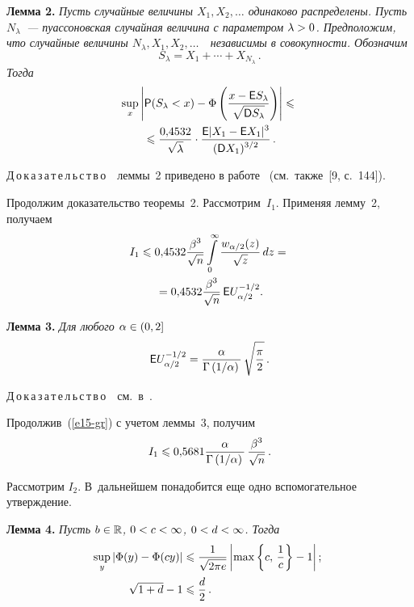 \begin{multicols}{2}
\medskip

\noindent
\textbf{Лемма 2.} \textit{Пусть случайные величины $X_1,X_2,\ldots$\linebreak
одинаково распределены. Пусть $N_{\lambda}$~--- пуассоновская
случайная величина с параметром $\lambda\hm>0$. Предположим, что
случайные величины $N_{\lambda},X_1,X_2,\ldots$\ \ независимы в
совокупности. Обозначим
$$
S_{\lambda}=X_1+\cdots+X_{N_{\lambda}}\,.
$$
Тогда}
\begin{multline*}
\sup\limits_x\left\vert {\sf P}(S_{\lambda}<x)-\Phi\left(\displaystyle\frac{\displaystyle x-{\sf E}S_{\lambda}\mathstrut}{\displaystyle \sqrt{{\sf D}S_{\lambda}}\mathstrut}\right)\right\vert 
\leqslant{}\\
{}\leqslant \displaystyle\frac{\displaystyle 0{,}4532\mathstrut}{\displaystyle \sqrt{\lambda}\mathstrut}\cdot\displaystyle\frac{\displaystyle {\sf E}|X_1-{\sf E}X_1|^3\mathstrut}{\displaystyle ({\sf D}X_1)^{3/2}\mathstrut}\,.
\end{multline*}


\noindent
Д\,о\,к\,а\,з\,а\,т\,е\,л\,ь\,с\,т\,в\,о\ \ леммы~2 приведено в 
работе~\cite{KorolevShevtsovaShorgin2011} (см.\ так\-же~[9, с.~144]).

\smallskip

Продолжим доказательство теоремы~2. Рас\-смот\-рим~$I_1$. Применяя лемму~2, получаем
\begin{multline}
I_1\leqslant0{,}4532\displaystyle\frac{\displaystyle \beta^3\mathstrut}{\displaystyle \sqrt{n}\mathstrut}\int\limits_{0}^{\infty}
\displaystyle\frac{\displaystyle w_{\alpha/2}(z)\mathstrut}{\displaystyle \sqrt{z}\mathstrut}\,
dz={}\\
{}=0{,}4532\displaystyle\frac{\displaystyle \beta^3\mathstrut}{\displaystyle \sqrt{n}\mathstrut}\,{\sf E}U_{\alpha/2}^{-1/2}.\label{e15-gr}
\end{multline}

\medskip

\noindent
\textbf{Лемма 3.} \textit{Для любого $\alpha\hm\in(0,2]$}
$$
{\sf E}U_{\alpha/2}^{-1/2}=\displaystyle\frac{\displaystyle \alpha\mathstrut}{\displaystyle \Gamma\left({1}/{\alpha}\right)\mathstrut}\,
\sqrt{\displaystyle\frac{\displaystyle \pi\mathstrut}{\displaystyle 2\mathstrut}}\,.
$$

\smallskip

\noindent
Д\,о\,к\,а\,з\,а\,т\,е\,л\,ь\,с\,т\,в\,о\ \ см.\ в~\cite{KBZZ2012}.

\smallskip

Продолжив~(\ref{e15-gr}) с учетом леммы~3, получим
$$
I_1\leqslant0{,}5681
\displaystyle\frac{\displaystyle \alpha\mathstrut}{\displaystyle \Gamma\left({1}/{\alpha}\right)\mathstrut}\,\displaystyle\frac{\displaystyle \beta^3\mathstrut}{\displaystyle \sqrt{n}\mathstrut}\,.
$$

Рассмотрим $I_2$. В~дальнейшем понадобится еще одно вспомогательное утверждение.

\medskip

\noindent
\textbf{Лемма 4.} \textit{Пусть $b\hm\in\r$, $0\hm<c\hm<\infty$, $0\hm<d\hm<\infty$.
Тогда}
\begin{align}
\hspace*{-2mm}\sup\limits_y|\Phi(y)-\Phi(cy)|&\leqslant
\fr{1}{\sqrt{2\pi e}}\left\vert \max\left\{c,\,\fr{1}{c}\right\}-1\right\vert;\!
\label{e16-gr}
\\
\sqrt{1+d}-1&\leqslant\fr{d}{2}\,.\label{e17-gr}
\end{align}


\end{multicols}
